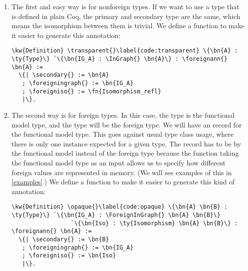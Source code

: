 \begin{enumerate}
\item The first and easy way is for non\gls{foreign type}s. If we want to use a type that is defined in plain Coq, the primary and secondary type are the same, which means the isomorphism between them is trivial. We define a function \transparent{} to make it easier to generate this annotation:

\begin{Verbatim}
\kw{Definition} \transparent{}\label{code:transparent} \{\bn{A} : \ty{Type}\} `\{\bn{IG_A} : \InGraph{} \bn{A}\} : \foreignann{} \bn{A} :=
  \{| \secondary{} := \bn{A}
   ; \foreigningraph{} := \bn{IG_A}
   ; \foreigniso{} := \fn{Isomorphism_refl}
   |\}.
\end{Verbatim}

\item The second way is for \gls{foreign type}s. In this case, the  type is the \gls{functional model} type, and the  type will be the \gls{foreign type}. We will have an \InGraph{} record for the \gls{functional model} type.
This goes against usual type class usage, where there is only one instance expected for a given type. The \InGraph{} record has to be  by the \gls{functional model} instead of the \gls{foreign type} because the \graphpredicate{} function taking the \gls{functional model} type as an input allows us to specify how different foreign values are represented in memory. (We will see examples of this in \autoref{examples}.) We define a function \opaque{} to make it easier to generate this kind of annotation:

\begin{Verbatim}
\kw{Definition} \opaque{}\label{code:opaque} \{\bn{A} \bn{B} : \ty{Type}\} `\{\bn{IG_A} : \ForeignInGraph{} \bn{A} \bn{B}\}
                 `\{\bn{Iso} : \ty{Isomorphism} \bn{A} \bn{B}\} : \foreignann{} \bn{A} :=
  \{| \secondary{} := \bn{B}
   ; \foreigningraph{} := \bn{IG_A}
   ; \foreigniso{} := \bn{Iso}
   |\}.
\end{Verbatim}
\end{enumerate}


